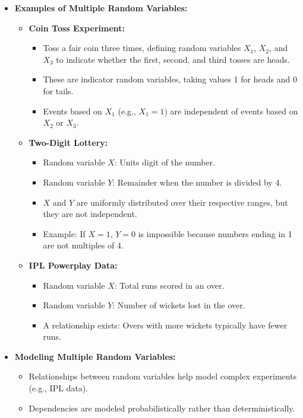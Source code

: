 \documentclass{article}
\begin{document}
\begin{itemize}
  \item \textbf{Examples of Multiple Random Variables:}
    \begin{itemize}
      \item \textbf{Coin Toss Experiment:}
        \begin{itemize}
          \item Toss a fair coin three times, defining random variables $X_1$, $X_2$, and $X_3$ to indicate whether the first, second, and third tosses are heads.
          \item These are indicator random variables, taking values 1 for heads and 0 for tails.
          \item Events based on $X_1$ (e.g., $X_1 = 1$) are independent of events based on $X_2$ or $X_3$.
        \end{itemize}
      \item \textbf{Two-Digit Lottery:}
        \begin{itemize}
          \item Random variable $X$: Units digit of the number.
          \item Random variable $Y$: Remainder when the number is divided by 4.
          \item $X$ and $Y$ are uniformly distributed over their respective ranges, but they are not independent.
          \item Example: If $X = 1$, $Y = 0$ is impossible because numbers ending in 1 are not multiples of 4.
        \end{itemize}
      \item \textbf{IPL Powerplay Data:}
        \begin{itemize}
          \item Random variable $X$: Total runs scored in an over.
          \item Random variable $Y$: Number of wickets lost in the over.
          \item A relationship exists: Overs with more wickets typically have fewer runs.
        \end{itemize}
    \end{itemize}

  \item \textbf{Modeling Multiple Random Variables:}
    \begin{itemize}
      \item Relationships between random variables help model complex experiments (e.g., IPL data).
      \item Dependencies are modeled probabilistically rather than deterministically.
    \end{itemize}


\end{itemize}
\end{document}
